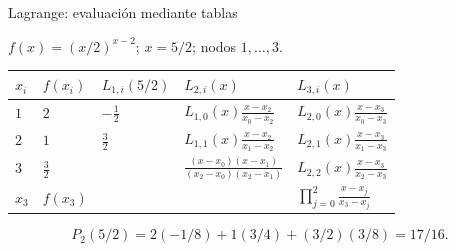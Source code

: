 \documentclass[original_version/main.tex]{subfiles}
\begin{document}
\begin{frame}[t]{Lagrange: evaluación mediante tablas}
\par\noindent\begin{minipage}[t][12mm][t]{\textwidth}\small\strut $f(x)=(x/2)^{x-2}$; $x=5/2$; nodos $1,\ldots,3$.\end{minipage}\par\nointerlineskip
\begin{minipage}[t]{\textwidth}\begingroup\scriptsize\setlength{\tabcolsep}{3pt}\begin{center}\begin{tabular}{|C{.065\textwidth}|C{.095\textwidth}|C{.19\textwidth}|C{.25\textwidth}|C{.25\textwidth}|}\hline
\rule[-2mm]{0pt}{6mm}$x_i$&$f(x_i)$&$L_{1,i}(5/2)$&$L_{2,i}(x)$&$L_{3,i}(x)$\\\hline
\rule[-2.5mm]{0pt}{9mm}$1$&$2$&$-\frac12$&$L_{1,0}(x)\frac{x-x_2}{x_0-x_2}$&$L_{2,0}(x)\frac{x-x_3}{x_0-x_3}$\\\hline
\rule[-2.5mm]{0pt}{9mm}$2$&$1$&$\frac32$&$L_{1,1}(x)\frac{x-x_2}{x_1-x_2}$&$L_{2,1}(x)\frac{x-x_3}{x_1-x_3}$\\\hline
\rule[-2.5mm]{0pt}{9mm}$3$&$\frac{3}{2}$&&$\frac{(x-x_0)(x-x_1)}{(x_2-x_0)(x_2-x_1)}$&$L_{2,2}(x)\frac{x-x_3}{x_2-x_3}$\\\hline
\rule[-2.5mm]{0pt}{9mm}$x_3$&$f(x_3)$&&&$\prod_{j=0}^2\frac{x-x_j}{x_3-x_j}$\\\hline
\end{tabular}\end{center}\endgroup\par
\end{minipage}\par\[P_2(5/2)=2(-1/8)+1(3/4)+(3/2)(3/8)=17/16.\]
\end{frame}
\end{document}
